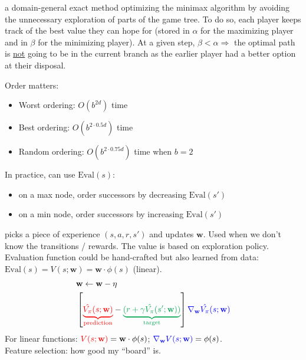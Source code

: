  a domain-general exact method optimizing the minimax
algorithm by avoiding the unnecessary exploration of parts of the game tree. To
do so, each player keeps track of the best value they can hope for (stored in
$\alpha$ for the maximizing player and in $\beta$ for the minimizing player). At
a given step, $\beta < \alpha \Rightarrow$ the optimal path is \underline{not}
going to be in the current branch as the earlier player had a better option at
their disposal.

Order matters:
\begin{itemize}
    \item Worst ordering: $O(b^{2d})$ time
    \item Best ordering: $O(b^{2\cdot0.5d})$ time
    \item Random ordering: $O(b^{2\cdot0.75d})$ time when $b = 2$
\end{itemize}
In practice, can use $\text{Eval}(s)$:\begin{itemize}
    \item on a max node, order successors by decreasing $\text{Eval}(s')$
    \item on a min node, order successors by increasing $\text{Eval}(s')$
\end{itemize}

 picks a piece of experience
$(s,a,r,s')$ and updates $\mathbf{w}$. Used when we don't know the transitions /
rewards. The value is based on exploration policy.\\
Evaluation function could be hand-crafted but also learned from data:
$\text{Eval}(s) = V(s;\mathbf{w}) = \mathbf{w}\cdot\phi(s)$ (linear).\\
\begin{displaymath}
\begin{split}
    &\mathbf{w} \leftarrow \mathbf{w} - \eta \\
    &\left[\textcolor{red}{\underbrace{\hat{V_\pi}(s;\mathbf{w})}_{\text{prediction}}}
    - \textcolor{Green}{\underbrace{(r + \gamma
    \hat{V_\pi}(s';\mathbf{w}))}_{\text{target}}}\right]
    \textcolor{blue}{\nabla_{\mathbf{w}}\hat{V_\pi}(s;\mathbf{w})}
\end{split}
\end{displaymath}
For linear functions: $\textcolor{red}{V(s;\mathbf{w})} = \mathbf{w} \cdot
\phi(s)$; $\textcolor{blue}{\nabla_{\mathbf{w}}V(s;\mathbf{w})} = \phi(s)$.
\\
Feature selection: how good my ``board'' is.

